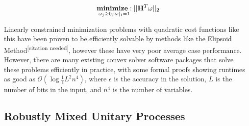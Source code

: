 \documentclass[aps,nofootinbib,pra,notitlepage,twocolumn]{revtex4-1}
\newcommand{\needcite}{{\color{blue}\textsuperscript{[citation needed]}}}
\begin{document}
\begin{equation}\label{eq:minimization}
  \begin{split}
    &\underset{\omega_j\geq0, |\omega|_1=1}{\textbf{minimize}: } ||\bold{H}^T\omega||_2\\
  \end{split}
\end{equation}

Linearly constrained minimization problems with quadratic cost functions like this have been proven to be efficiently solvable by methods like the Elipsoid Method\needcite, however these have very poor average case performance. However, there are many existing convex solver software packages that solve these problems efficiently in practice, with some formal proofs showing runtimes as good as $\mathcal{O}(\log{\frac{1}{\epsilon}}L^2n^4)$, where $\epsilon$ is the accuracy in the solution, $L$ is the number of bits in the input, and $n^4$ is the number of variables.




\subsection{Robustly Mixed Unitary Processes}
\label{sec:robustly_mixed}
\end{document}
